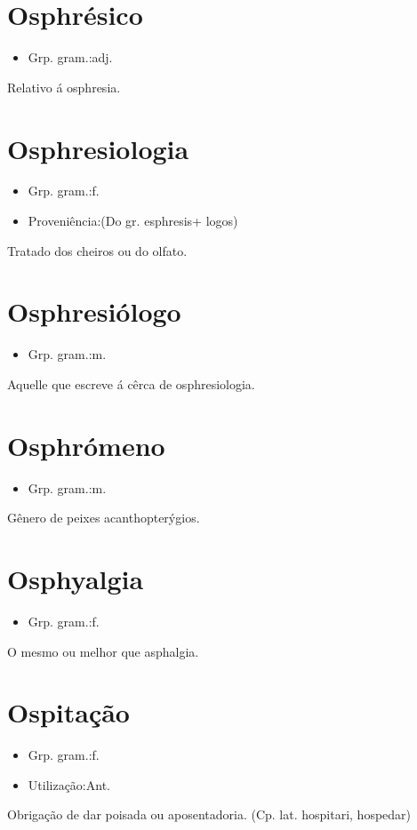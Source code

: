 \section{Osphrésico}
\begin{itemize}
\item {Grp. gram.:adj.}
\end{itemize}
Relativo á osphresia.
\section{Osphresiologia}
\begin{itemize}
\item {Grp. gram.:f.}
\end{itemize}
\begin{itemize}
\item {Proveniência:(Do gr. \textunderscore esphresis\textunderscore  + \textunderscore logos\textunderscore )}
\end{itemize}
Tratado dos cheiros ou do olfato.
\section{Osphresiólogo}
\begin{itemize}
\item {Grp. gram.:m.}
\end{itemize}
Aquelle que escreve á cêrca de osphresiologia.
\section{Osphrómeno}
\begin{itemize}
\item {Grp. gram.:m.}
\end{itemize}
Gênero de peixes acanthopterýgios.
\section{Osphyalgia}
\begin{itemize}
\item {Grp. gram.:f.}
\end{itemize}
O mesmo ou melhor que \textunderscore asphalgia\textunderscore .
\section{Ospitação}
\begin{itemize}
\item {Grp. gram.:f.}
\end{itemize}
\begin{itemize}
\item {Utilização:Ant.}
\end{itemize}
Obrigação de dar poisada ou aposentadoria.
(Cp. lat. \textunderscore hospitari\textunderscore , hospedar)
